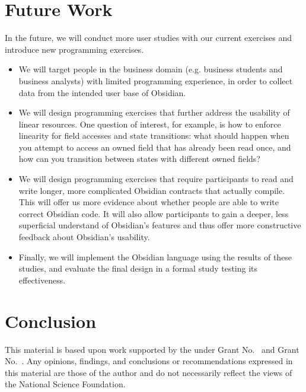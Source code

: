 \documentclass[sigplan,10pt,review]{acmart}\settopmatter{printfolios=true}
\begin{document}
\section{Future Work}

In the future, we will conduct more user studies with our current exercises and introduce new programming
exercises.
\begin{itemize}
\item We will target people in the business domain (e.g. business students and business analysts) with limited
programming experience, in order to collect data from the intended user base of Obsidian.
\item We will design programming exercises that further address the usability of linear resources. One question
of interest, for example, is how to enforce linearity for field accesses and state transitions: what should happen
when you attempt to access an owned field that has already been read once, and how can you transition
between states with different owned fields? 
\item We will design programming exercises that require participants to read and write longer, more complicated 
Obsidian contracts that actually compile. This will offer us more evidence about whether people are able to write 
correct Obsidian code. It will also allow participants to gain a deeper, less superficial understand of Obsidian's 
features and thus offer more constructive feedback about Obsidian's usability. 
\item Finally, we will implement the Obsidian language using the results of these studies, 
and evaluate the final design in a formal study testing its effectiveness.
\end{itemize}

\section{Conclusion}



\begin{acks}                            %
  This material is based upon work supported by the
   under Grant
  No.~ and Grant
  No.~.  Any opinions, findings, and
  conclusions or recommendations expressed in this material are those
  of the author and do not necessarily reflect the views of the
  National Science Foundation.
\end{acks}
\end{document}
